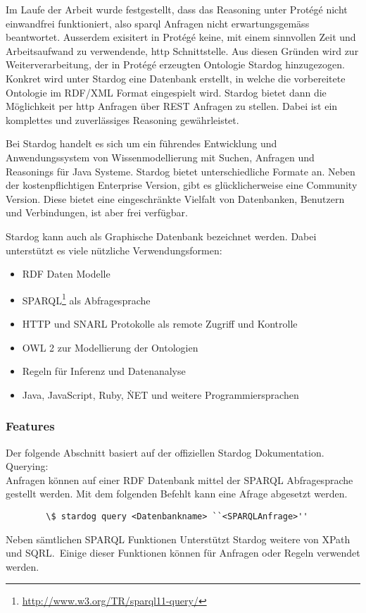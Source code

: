 Im Laufe der Arbeit wurde festgestellt, dass das Reasoning unter Protégé nicht einwandfrei funktioniert, also sparql Anfragen nicht erwartungsgemäss beantwortet. Ausserdem exisitert in Protégé keine, mit einem sinnvollen Zeit und Arbeitsaufwand zu verwendende, http Schnittstelle. Aus diesen Gründen wird zur Weiterverarbeitung, der in Protégé erzeugten Ontologie Stardog hinzugezogen.\\
Konkret wird unter Stardog eine Datenbank erstellt, in welche die vorbereitete Ontologie im RDF/XML Format eingespielt wird. Stardog bietet dann die Möglichkeit per http Anfragen über REST Anfragen zu stellen. Dabei ist ein komplettes und zuverlässiges Reasoning gewährleistet.

Bei Stardog handelt es sich um ein führendes Entwicklung und Anwendungssystem von Wissenmodellierung mit Suchen, Anfragen und Reasonings für Java Systeme. Stardog bietet unterschiedliche Formate an. Neben der kostenpflichtigen Enterprise Version, gibt es glücklicherweise eine Community Version. Diese bietet eine eingeschränkte Vielfalt von Datenbanken, Benutzern und Verbindungen, ist aber frei verfügbar.\cite{stardog}

Stardog kann auch als Graphische Datenbank bezeichnet werden. Dabei unterstützt es viele nützliche Verwendungsformen:
\begin{itemize}
	\item RDF Daten Modelle
	\item SPARQL\footnote{\url{http://www.w3.org/TR/sparql11-query/}} als Abfragesprache
	\item HTTP und SNARL Protokolle als remote Zugriff und Kontrolle
	\item OWL 2 zur Modellierung der Ontologien
	\item Regeln für Inferenz und Datenanalyse
	\item Java, JavaScript, Ruby, \.NET und weitere Programmiersprachen
\end{itemize}
\cite{stardogDocu}

\subsubsection{Features}
\label{ssubsec:features}
Der folgende Abschnitt basiert auf der offiziellen Stardog Dokumentation.\cite{stardogDocuUsing}\\

Querying:\\
Anfragen können auf einer RDF Datenbank mittel der SPARQL Abfragesprache gestellt werden. Mit dem folgenden Befehlt kann eine Afrage abgesetzt werden.\\
\begin{lstlisting}
		\$ stardog query <Datenbankname> ``<SPARQLAnfrage>''
\end{lstlisting}	
Neben sämtlichen SPARQL Funktionen Unterstützt Stardog weitere von XPath und SQRL.\ Einige dieser Funktionen können für Anfragen oder Regeln verwendet werden.

